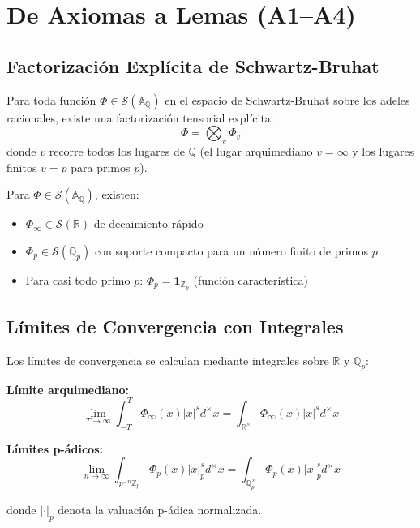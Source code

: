 \section{De Axiomas a Lemas (A1--A4)}

\subsection{Factorización Explícita de Schwartz-Bruhat}

Para toda función $\Phi \in \mathcal{S}(\mathbb{A}_\mathbb{Q})$ en el espacio de Schwartz-Bruhat sobre los adeles racionales, existe una factorización tensorial explícita:
\[
\Phi = \bigotimes_{v} \Phi_v
\]
donde $v$ recorre todos los lugares de $\mathbb{Q}$ (el lugar arquimediano $v = \infty$ y los lugares finitos $v = p$ para primos $p$).

\begin{proposition}
Para $\Phi \in \mathcal{S}(\mathbb{A}_\mathbb{Q})$, existen:
\begin{itemize}
\item $\Phi_\infty \in \mathcal{S}(\mathbb{R})$ de decaimiento rápido
\item $\Phi_p \in \mathcal{S}(\mathbb{Q}_p)$ con soporte compacto para un número finito de primos $p$
\item Para casi todo primo $p$: $\Phi_p = \mathbf{1}_{\mathbb{Z}_p}$ (función característica)
\end{itemize}
\end{proposition}

\subsection{Límites de Convergencia con Integrales}

Los límites de convergencia se calculan mediante integrales sobre $\mathbb{R}$ y $\mathbb{Q}_p$:

\textbf{Límite arquimediano:}
\[
\lim_{T \to \infty} \int_{-T}^{T} \Phi_\infty(x) |x|^s d^\times x = \int_{\mathbb{R}^\times} \Phi_\infty(x) |x|^s d^\times x
\]

\textbf{Límites p-ádicos:}
\[
\lim_{n \to \infty} \int_{p^{-n}\mathbb{Z}_p} \Phi_p(x) |x|_p^s d^\times x = \int_{\mathbb{Q}_p^\times} \Phi_p(x) |x|_p^s d^\times x
\]

donde $|\cdot|_p$ denota la valuación p-ádica normalizada.

